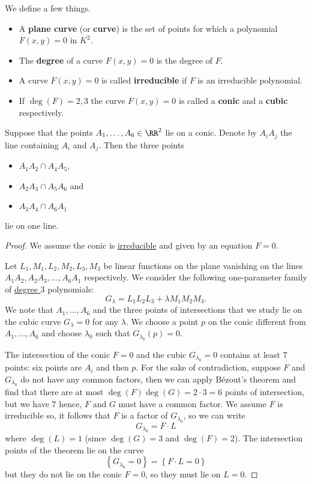 \documentclass[12pt, a4paper]{article}
\begin{document}
\begin{definition}
    We define a few things.
    \begin{itemize}
        \item A \textbf{plane curve} (or \textbf{curve}) is the set of points for which a polynomial \(F(x,y)=0\) in \(K^2\).
        \item The \textbf{degree} of a curve \(F(x,y)=0\) is the degree of \(F\).
        \item A curve \(F(x,y)=0\) is called \textbf{irreducible} if \(F\) is an irreducible polynomial.
        \item If \(\deg(F)=2,3\) the curve \(F(x,y)=0\) is called a \textbf{conic} and a \textbf{cubic} respectively.
    \end{itemize}
\end{definition}

\begin{mdthm}[Pascal]
    Suppose that the points \(A_1,\ldots,A_6 \in \RR^2\) lie on a conic. Denote by \(A_iA_j\) the line containing \(A_i\) and \(A_j\). Then the three points 
    \begin{itemize}
        \item \(A_1A_2 \cap A_4A_5\),
        \item \(A_2A_3\cap A_5A_6\) and 
        \item \(A_3A_4\cap A_6A_1\)
    \end{itemize}
    lie on one line.
\end{mdthm}

\begin{proof}
    We assume the conic is \ul{irreducible} and given by an equation \(F=0\). 
    
    Let \({L_1,M_1,L_2,M_2,L_3,M_3}\) be linear functions on the plane vanishing on the lines \(A_1A_2, A_2A_3,\ldots,A_6A_1\) respectively. We consider the following one-parameter family of \ul{degree \(3\)} polynomials:
    \[G_{\lambda} = L_1L_2L_3 + \lambda M_1M_2M_3.\]
    We note that \(A_1,\ldots,A_6\) and the three points of intersections that we study lie on the cubic curve \(G_{\lambda}=0\) for any \(\lambda\). We choose a point \(p\) on the conic different from \(A_1,\ldots,A_6\) and choose \(\lambda_0\) such that \(G_{\lambda_0}(p)=0\). 

    The intersection of the conic \(F=0\) and the cubic \(G_{\lambda_0}=0\) contains at least \(7\) points: six points are \(A_i\) and then \(p\). For the sake of contradiction, suppose \(F\) and \(G_{\lambda_0}\) do not have any common factors, then we can apply Bézout's theorem and find that there are at most \(\deg(F)\deg(G)=2\cdot 3=6\) points of intersection, but we have \(7\) hence, \(F\) and \(G\) must have a common factor. We assume \(F\) is irreducible so, it follows that \(F\) is a factor of \(G_{\lambda_0}\), so we can write 
    \[G_{\lambda_0} = F \cdot L\]
    where \(\deg(L)=1\) (since \(\deg(G)=3\) and \(\deg(F)=2\)). The intersection points of the theorem lie on the curve 
    \[\left\{ G_{\lambda_0}=0 \right\} = \left\{ F\cdot L=0 \right\}\]
    but they do not lie on the conic \(F=0\), so they must lie on \(L=0\).
\end{proof}
\end{document}
